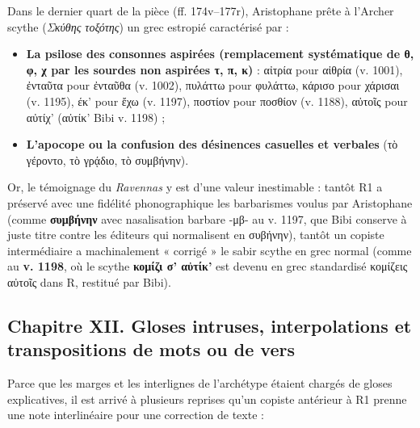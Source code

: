 \documentclass[11pt, a4paper, twoside]{article}
\renewcommand{\_}{\origunderscore\penalty0\relax}
\renewcommand{\texttt}[1]{#1}
\newcommand{\R}{\textbf{R}}
\newcommand{\Run}{\textbf{R}\textsuperscript{1}}
\newcommand{\Bibi}{\textit{Bibi}}
\def\R{R}%
\def\Run{R1}%
\def\Bibi{Bibi}%
\begin{document}
Dans le dernier quart de la pièce (\texttt{ff. 174v–177r}), Aristophane prête à l'Archer scythe (\textit{Σκύθης τοξότης}) un grec estropié caractérisé par :
\begin{itemize}[leftmargin=1.5em, itemsep=2pt]
  \item \textbf{La psilose des consonnes aspirées (remplacement systématique de θ, φ, χ par les sourdes non aspirées τ, π, κ)} : \texttt{αἰτρία} pour \texttt{αἰθρία} (v. 1001), \texttt{ἐνταῦτα} pour \texttt{ἐνταῦθα} (v. 1002), \texttt{πυλάττω} pour \texttt{φυλάττω}, \texttt{κάρισο} pour \texttt{χάρισαι} (v. 1195), \texttt{έκ'} pour \texttt{ἔχω} (v. 1197), \texttt{ποστίον} pour \texttt{ποσθίον} (v. 1188), \texttt{αὐτοῖς} pour \texttt{αὐτίχ'} (\texttt{αὐτίκ'} \Bibi{} v. 1198) ;
  \item \textbf{L'apocope ou la confusion des désinences casuelles et verbales} (\texttt{τὸ γέροντο}, \texttt{τὸ γρᾴδιο}, \texttt{τὸ συμβήνην}).
\end{itemize}
Or, le témoignage du \textit{Ravennas} y est d'une valeur inestimable : tantôt \Run{} a préservé avec une fidélité phonographique les barbarismes voulus par Aristophane (comme \textbf{\texttt{συμβήνην}} avec nasalisation barbare -μβ- au v. 1197, que \Bibi{} conserve à juste titre contre les éditeurs qui normalisent en \texttt{συβήνην}), tantôt un copiste intermédiaire a machinalement « corrigé » le sabir scythe en grec normal (comme au \textbf{v. 1198}, où le scythe \textbf{\texttt{κομίζι σ' αὐτίκ'}} est devenu en grec standardisé \texttt{κομίζεις αὐτοῖς} dans \R{}, restitué par \Bibi{}).



\subsection{Chapitre XII. Gloses intruses, interpolations et transpositions de mots ou de vers}

Parce que les marges et les interlignes de l'archétype étaient chargés de gloses explicatives, il est arrivé à plusieurs reprises qu'un copiste antérieur à \Run{} prenne une note interlinéaire pour une correction de texte :
\end{document}
